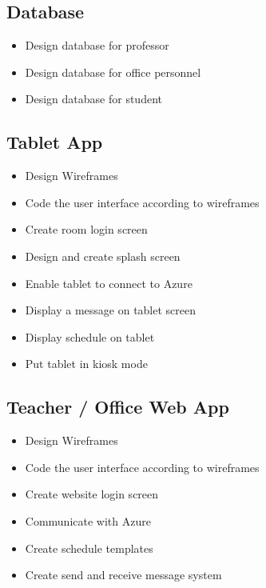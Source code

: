 \documentclass{article}
\begin{document}
\subsection*{Database}
\begin{itemize}
	\item Design database for professor
	\item Design database for office personnel
	\item Design database for student
\end{itemize}

\subsection*{Tablet App}
\begin{itemize}
	\item Design Wireframes
	\item Code the user interface according to wireframes
	\item Create room login screen
	\item Design and create splash screen
	\item Enable tablet to connect to Azure
	\item Display a message on tablet screen
	\item Display schedule on tablet	
	\item Put tablet in kiosk mode
\end{itemize}

\subsection*{Teacher / Office Web App}
\begin{itemize}
	\item Design Wireframes
	\item Code the user interface according to wireframes
	\item Create website login screen
	\item Communicate with Azure
	\item Create schedule templates
	\item Create send and receive message system
\end{itemize}
\end{document}
